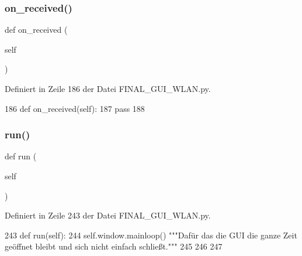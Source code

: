 \subsubsection{\texorpdfstring{on\+\_\+received()}{on\_received()}}
{\footnotesize\ttfamily def on\+\_\+received (\begin{DoxyParamCaption}\item[{}]{self }\end{DoxyParamCaption})}



Definiert in Zeile 186 der Datei F\+I\+N\+A\+L\+\_\+\+G\+U\+I\+\_\+\+W\+L\+A\+N.\+py.


\begin{DoxyCode}
186     \textcolor{keyword}{def }on\_received(self):
187         \textcolor{keywordflow}{pass}
188         
\end{DoxyCode}
\mbox{\label{class_f_i_n_a_l___g_u_i___w_l_a_n_1_1_w_l_a_n_ad22709b2e67308af35f55680d5a026e0}} 
\subsubsection{\texorpdfstring{run()}{run()}}
{\footnotesize\ttfamily def run (\begin{DoxyParamCaption}\item[{}]{self }\end{DoxyParamCaption})}



Definiert in Zeile 243 der Datei F\+I\+N\+A\+L\+\_\+\+G\+U\+I\+\_\+\+W\+L\+A\+N.\+py.


\begin{DoxyCode}
243     \textcolor{keyword}{def }run(self):
244         self.window.mainloop()          \textcolor{stringliteral}{"""Dafür das die GUI die ganze Zeit geöffnet bleibt und sich nicht
       einfach schließt."""}
245         
246    
247 
\end{DoxyCode}
\mbox{\label{class_f_i_n_a_l___g_u_i___w_l_a_n_1_1_w_l_a_n_afeb2bad2d8c6b65fe0b779ced76908df}} 
